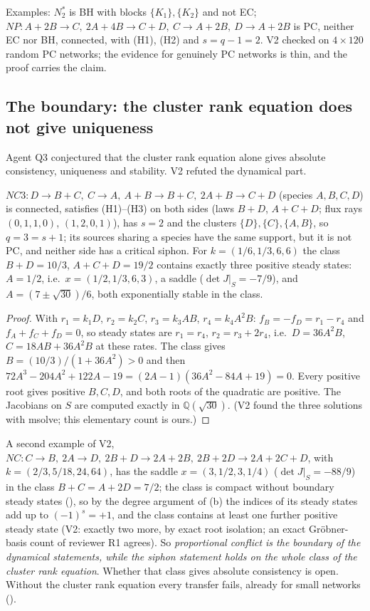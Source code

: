 \documentclass[11pt,a4paper]{report}
\begin{document}
Examples: \(N_2^*\) is BH with blocks \(\{K_1\},\{K_2\}\) and not EC; \(NP\colon A+2B\to C,\ 2A+4B\to C+D,\ C\to A+2B,\
D\to A+2B\) is PC, neither EC nor BH, connected, with (H1), (H2) and \(s=q-1=2\). V2 checked  on
\(4\times120\) random PC networks; the evidence for genuinely PC networks is thin, and the proof carries the claim.

\subsection{The boundary: the cluster rank equation does not give uniqueness}

Agent Q3 conjectured that the cluster rank equation alone gives absolute consistency, uniqueness and stability. V2
refuted the dynamical part.

\begin{proposition}\label{prop:NC3}
\(NC3\colon D\to B+C,\ C\to A,\ A+B\to B+C,\ 2A+B\to C+D\) (species \(A,B,C,D\)) is connected, satisfies (H1)--(H3)
on both sides (laws \(B+D\), \(A+C+D\); flux rays \((0,1,1,0)\), \((1,2,0,1)\)), has \(s=2\) and the clusters
\(\{D\},\{C\},\{A,B\}\), so \(q=3=s+1\); its sources sharing a species have the same support, but it is not PC, and
neither side has a critical siphon. For \(k=(1/6,1/3,6,6)\) the class \(B+D=10/3\), \(A+C+D=19/2\) contains exactly
three positive steady states: \(A=1/2\), i.e.\ \(x=(1/2,1/3,6,3)\), a saddle (\(\det J|_S=-7/9\)), and
\(A=(7\pm\sqrt{30})/6\), both exponentially stable in the class.
\end{proposition}
\begin{proof}
With \(r_1=k_1D\), \(r_2=k_2C\), \(r_3=k_3AB\), \(r_4=k_4A^2B\): \(f_B=-f_D=r_1-r_4\) and \(f_A+f_C+f_D=0\), so steady
states are \(r_1=r_4\), \(r_2=r_3+2r_4\), i.e.\ \(D=36A^2B\), \(C=18AB+36A^2B\) at these rates. The class gives
\(B=(10/3)/(1+36A^2)>0\) and then \(72A^3-204A^2+122A-19=(2A-1)(36A^2-84A+19)=0\). Every positive root gives positive
\(B,C,D\), and both roots of the quadratic are positive. The Jacobians on \(S\) are computed exactly in
\(\mathbb{Q}(\sqrt{30})\). (V2 found the three solutions with msolve; this elementary count is ours.)
\end{proof}

A second example of V2, \(NC\colon C\to B,\ 2A\to D,\ 2B+D\to2A+2B,\ 2B+2D\to2A+2C+D\), with \(k=(2/3,5/18,24,64)\), has
the saddle \(x=(3,1/2,3,1/4)\) (\(\det J|_S=-88/9\)) in the class \(B+C=A+2D=7/2\); the class is compact without boundary steady states
(\zcref{thm:Cgen}), so by the degree argument of \zcref{thm:Ustar}(b) the indices of its steady states add up to
\((-1)^s=+1\), and the class contains at least one further positive steady state (V2: exactly two more, by exact root
isolation; an exact Gröbner-basis count of reviewer R1 agrees). So
\emph{proportional conflict is the boundary of the dynamical statements, while the siphon statement holds on the whole
class of the cluster rank equation}. Whether that class gives absolute consistency is open. Without the cluster
rank equation every transfer fails, already for small networks (\zcref{tab:failures}).
\end{document}
